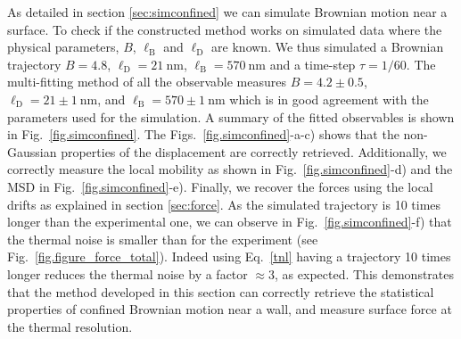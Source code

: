 As detailed in section \ref{sec:simconfined} we can simulate Brownian motion near a surface. To check if the constructed method works on simulated data where the physical parameters, $B$, $\ell_\mathrm{B}$ and $\ell_\mathrm{D}$ are known. We thus simulated a Brownian trajectory $B = 4.8$, $\ell_\mathrm{D} = 21 ~ \mathrm{nm}$, $\ell_\mathrm{B} = 570~\mathrm{nm}$ and a time-step $\tau = 1/60$. The multi-fitting method of all the observable measures $B = 4.2 \pm 0.5$, $\ell_\mathrm{D} = 21\pm 1 ~ \mathrm{nm}$, and $\ell_\mathrm{B} = 570 \pm 1~\mathrm{nm}$ which is in good agreement with the parameters used for the simulation. A summary of the fitted observables is shown in Fig.~\ref{fig.simconfined}. The Figs.~\ref{fig.simconfined}-a-c) shows that the non-Gaussian properties of the displacement are correctly retrieved. Additionally, we correctly measure the local mobility as shown in Fig.~\ref{fig.simconfined}-d) and the \gls{MSD} in Fig.~\ref{fig.simconfined}-e). Finally, we recover the forces using the local drifts as explained in section \ref{sec:force}. As the simulated trajectory is 10 times longer than the experimental one, we can observe in Fig.~\ref{fig.simconfined}-f) that the thermal noise is smaller than for the experiment (see Fig.~\ref{fig.figure_force_total}). Indeed using Eq.~\ref{tnl} having a trajectory 10 times longer reduces the thermal noise by a factor $\approx 3$, as expected. This demonstrates that the method developed in this section can correctly retrieve the statistical properties of confined Brownian motion near a wall, and measure surface force at the thermal resolution.


